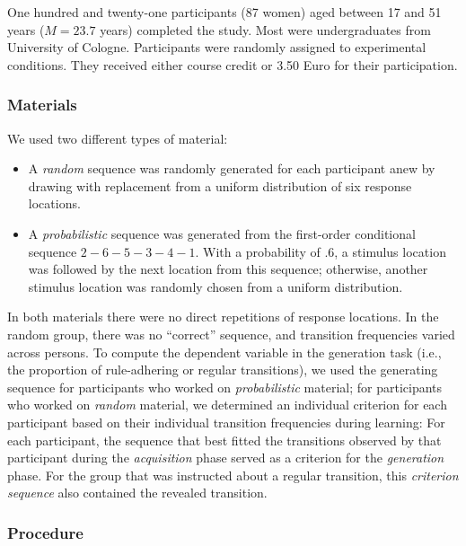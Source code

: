 \documentclass[floatsintext,man]{apa6}
\providecommand{\tightlist}{%
  \setlength{\itemsep}{0pt}\setlength{\parskip}{0pt}}
\begin{document}
One hundred and twenty-one participants (87 women) aged between 17 and
51 years (\(M = 23.7\) years) completed the study. Most were
undergraduates from University of Cologne. Participants were randomly
assigned to experimental conditions. They received either course credit
or 3.50 Euro for their participation.

\subsubsection{Materials}\label{materials}

We used two different types of material:

\begin{itemize}
\tightlist
\item
  A \emph{random} sequence was randomly generated for each participant
  anew by drawing with replacement from a uniform distribution of six
  response locations.
\item
  A \emph{probabilistic} sequence was generated from the first-order
  conditional sequence \(2-6-5-3-4-1\). With a probability of \(.6\), a
  stimulus location was followed by the next location from this
  sequence; otherwise, another stimulus location was randomly chosen
  from a uniform distribution.
\end{itemize}

In both materials there were no direct repetitions of response
locations. In the random group, there was no \enquote{correct} sequence,
and transition frequencies varied across persons. To compute the
dependent variable in the generation task (i.e., the proportion of
rule-adhering or regular transitions), we used the generating sequence
for participants who worked on \emph{probabilistic} material; for
participants who worked on \emph{random} material, we determined an
individual criterion for each participant based on their individual
transition frequencies during learning: For each participant, the
sequence that best fitted the transitions observed by that participant
during the \emph{acquisition} phase served as a criterion for the
\emph{generation} phase. For the group that was instructed about a
regular transition, this \emph{criterion sequence} also contained the
revealed transition.

\subsubsection{Procedure}\label{procedure}
\end{document}
